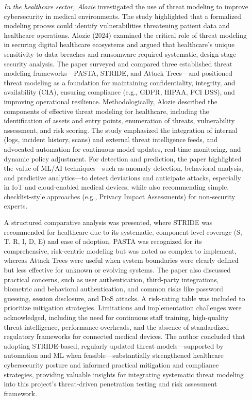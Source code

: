 \textit{In the healthcare sector, Alozie} investigated the use of threat modeling to improve cybersecurity in medical environments. The study highlighted that a formalized modeling process could identify vulnerabilities threatening patient data and healthcare operations. Alozie (2024) examined the critical role of threat modeling in securing digital healthcare ecosystems and argued that healthcare's unique sensitivity to data breaches and ransomware required systematic, design-stage security analysis. The paper surveyed and compared three established threat modeling frameworks—PASTA, STRIDE, and Attack Trees—and positioned threat modeling as a foundation for maintaining confidentiality, integrity, and availability (CIA), ensuring compliance (e.g., GDPR, HIPAA, PCI DSS), and improving operational resilience. Methodologically, Alozie described the components of effective threat modeling for healthcare, including the identification of assets and entry points, enumeration of threats, vulnerability assessment, and risk scoring. The study emphasized the integration of internal (logs, incident history, scans) and external threat intelligence feeds, and advocated automation for continuous model updates, real-time monitoring, and dynamic policy adjustment. For detection and prediction, the paper highlighted the value of ML/AI techniques—such as anomaly detection, behavioral analysis, and predictive analytics—to detect deviations and anticipate attacks, especially in IoT and cloud-enabled medical devices, while also recommending simple, checklist-style approaches (e.g., Privacy Impact Assessments) for non-security experts.

A structured comparative analysis was presented, where STRIDE was recommended for healthcare due to its systematic, component-level coverage (S, T, R, I, D, E) and ease of adoption. PASTA was recognized for its comprehensive, risk-centric modeling but was noted as complex to implement, whereas Attack Trees were useful when system boundaries were clearly defined but less effective for unknown or evolving systems. The paper also discussed practical concerns, such as user authentication, third-party integrations, biometric and behavioral authentication, and common risks like password guessing, session disclosure, and DoS attacks. A risk-rating table was included to prioritize mitigation strategies. Limitations and implementation challenges were acknowledged, including the need for continuous staff training, high-quality threat intelligence, performance overheads, and the absence of standardized regulatory frameworks for connected medical devices. The author concluded that adopting STRIDE-based, regularly updated threat models—supported by automation and ML when feasible—substantially strengthened healthcare cybersecurity posture and informed practical mitigation and compliance strategies, providing valuable insights for integrating systematic threat modeling into this project's threat-driven penetration testing and risk assessment framework. \cite{alozie2024}

